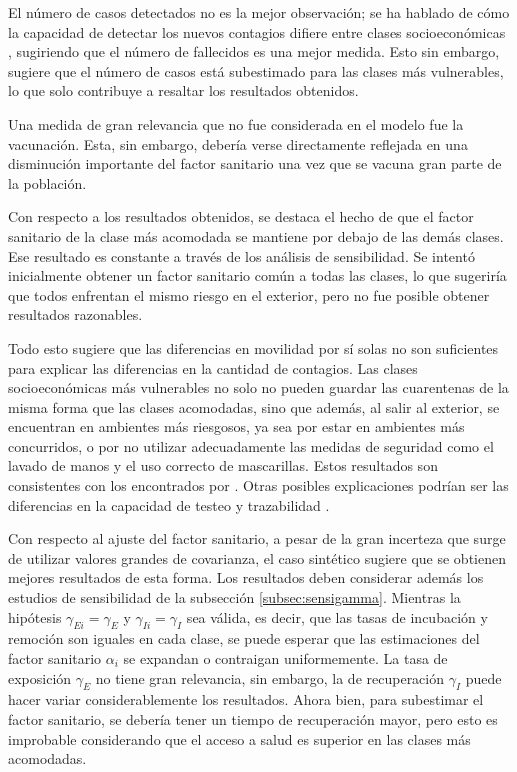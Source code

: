 El número de casos detectados no es la mejor observación; se ha hablado de cómo la capacidad de detectar los nuevos contagios difiere entre clases socioeconómicas \cite{Mena2021}, sugiriendo que el número de fallecidos es una mejor medida. Esto sin embargo, sugiere que el número de casos está subestimado para las clases más vulnerables, lo que solo contribuye a resaltar los resultados obtenidos.

Una medida de gran relevancia que no fue considerada en el modelo fue la vacunación. Esta, sin embargo, debería verse directamente reflejada en una disminución importante del factor sanitario una vez que se vacuna gran parte de la población.

Con respecto a los resultados obtenidos, se destaca el hecho de que el factor sanitario de la clase más acomodada se mantiene por debajo de las demás clases. Ese resultado es constante a través de los análisis de sensibilidad. Se intentó inicialmente obtener un factor sanitario común a todas las clases, lo que sugeriría que todos enfrentan el mismo riesgo en el exterior, pero no fue posible obtener resultados razonables.

Todo esto sugiere que las diferencias en movilidad por sí solas no son suficientes para explicar las diferencias en la cantidad de contagios. Las clases socioeconómicas más vulnerables no solo no pueden guardar las cuarentenas de la misma forma que las clases acomodadas, sino que además, al salir al exterior, se encuentran en ambientes más riesgosos, ya sea por estar en ambientes más concurridos, o por no utilizar adecuadamente las medidas de seguridad como el lavado de manos y el uso correcto de mascarillas. Estos resultados son consistentes con los encontrados por \cite{Chang2021}. Otras posibles explicaciones podrían ser las diferencias en la capacidad de testeo y trazabilidad \cite{Bennett2021}\cite{Mena2021}.

Con respecto al ajuste del factor sanitario, a pesar de la gran incerteza que surge de utilizar valores grandes de covarianza, el caso sintético sugiere que se obtienen mejores resultados de esta forma. Los resultados deben considerar además los estudios de sensibilidad de la subsección \ref{subsec:sensigamma}. Mientras la hipótesis \(\gamma_{Ei} = \gamma_E\) y \(\gamma_{Ii} = \gamma_I\) sea válida, es decir, que las tasas de incubación y remoción son iguales en cada clase, se puede esperar que las estimaciones del factor sanitario \(\alpha_i\) se expandan o contraigan uniformemente. La tasa de exposición \(\gamma_E\) no tiene gran relevancia, sin embargo, la de recuperación \(\gamma_I\) puede hacer variar considerablemente los resultados. Ahora bien, para subestimar el factor sanitario, se debería tener un tiempo de recuperación mayor, pero esto es improbable considerando que el acceso a salud es superior en las clases más acomodadas.

